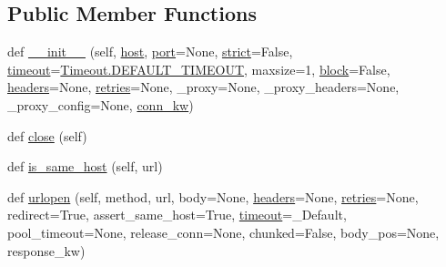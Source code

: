 \subsection*{Public Member Functions}
\begin{DoxyCompactItemize}
\item 
def \hyperlink{classpip_1_1__vendor_1_1urllib3_1_1connectionpool_1_1HTTPConnectionPool_a9b82b015413ba9d62417eceb3d5b93f8}{\+\_\+\+\_\+init\+\_\+\+\_\+} (self, \hyperlink{classpip_1_1__vendor_1_1urllib3_1_1connectionpool_1_1ConnectionPool_a96f7b726b786cd4dcb95148eaf744173}{host}, \hyperlink{classpip_1_1__vendor_1_1urllib3_1_1connectionpool_1_1ConnectionPool_a94af8217ab998da72b40c21c21a80b5a}{port}=None, \hyperlink{classpip_1_1__vendor_1_1urllib3_1_1connectionpool_1_1HTTPConnectionPool_a1084d4788cf733c417a2c7b30aa749b4}{strict}=False, \hyperlink{classpip_1_1__vendor_1_1urllib3_1_1connectionpool_1_1HTTPConnectionPool_a43c45441e89c527cd109ddcfdd371e62}{timeout}=\hyperlink{classpip_1_1__vendor_1_1urllib3_1_1util_1_1timeout_1_1Timeout_ab2e2090779413149cdac51e5b0908e12}{Timeout.\+D\+E\+F\+A\+U\+L\+T\+\_\+\+T\+I\+M\+E\+O\+UT}, maxsize=1, \hyperlink{classpip_1_1__vendor_1_1urllib3_1_1connectionpool_1_1HTTPConnectionPool_ab75440494cfe89f84809b416845fea8c}{block}=False, \hyperlink{classpip_1_1__vendor_1_1urllib3_1_1request_1_1RequestMethods_a507ade459b427bd81a5a8849563702e3}{headers}=None, \hyperlink{classpip_1_1__vendor_1_1urllib3_1_1connectionpool_1_1HTTPConnectionPool_a78a4bbd8c180f2cf92c9bf0004be3168}{retries}=None, \+\_\+proxy=None, \+\_\+proxy\+\_\+headers=None, \+\_\+proxy\+\_\+config=None, \hyperlink{classpip_1_1__vendor_1_1urllib3_1_1connectionpool_1_1HTTPConnectionPool_aa9915cfa4a109bb783fe65c9ca484ef0}{conn\+\_\+kw})
\item 
def \hyperlink{classpip_1_1__vendor_1_1urllib3_1_1connectionpool_1_1HTTPConnectionPool_ae83ff576cb9efe1b85fc56bad31a9344}{close} (self)
\item 
def \hyperlink{classpip_1_1__vendor_1_1urllib3_1_1connectionpool_1_1HTTPConnectionPool_acd3ce694d609dd202d2ecc1a90116c18}{is\+\_\+same\+\_\+host} (self, url)
\item 
def \hyperlink{classpip_1_1__vendor_1_1urllib3_1_1connectionpool_1_1HTTPConnectionPool_a3f0bd3c72c7fc578162e68f3a57289fa}{urlopen} (self, method, url, body=None, \hyperlink{classpip_1_1__vendor_1_1urllib3_1_1request_1_1RequestMethods_a507ade459b427bd81a5a8849563702e3}{headers}=None, \hyperlink{classpip_1_1__vendor_1_1urllib3_1_1connectionpool_1_1HTTPConnectionPool_a78a4bbd8c180f2cf92c9bf0004be3168}{retries}=None, redirect=True, assert\+\_\+same\+\_\+host=True, \hyperlink{classpip_1_1__vendor_1_1urllib3_1_1connectionpool_1_1HTTPConnectionPool_a43c45441e89c527cd109ddcfdd371e62}{timeout}=\+\_\+\+Default, pool\+\_\+timeout=None, release\+\_\+conn=None, chunked=False, body\+\_\+pos=None, response\+\_\+kw)
\end{DoxyCompactItemize}

